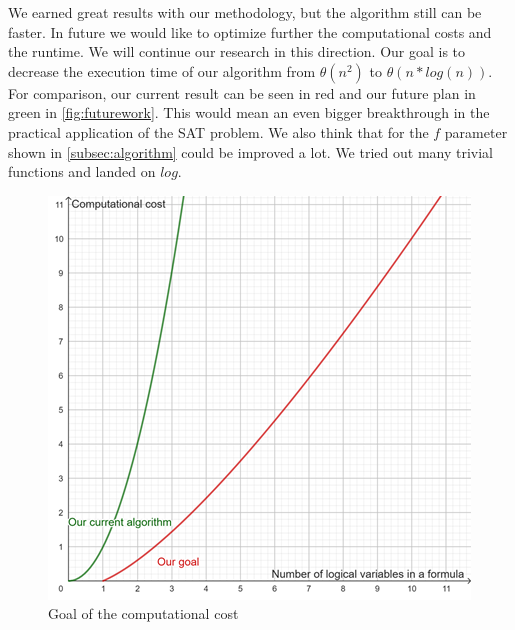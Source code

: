 \documentclass{article}
\begin{document}
We earned great results with our methodology, but the algorithm still can be faster.
In future we would like to optimize further the computational costs and the runtime.
We will continue our research in this direction. 
Our goal is to decrease the execution time of our algorithm from $\theta(n^2)$ to $\theta (n*log(n))$. For comparison, our current result can be seen in red and our future plan in green in \autoref{fig:futurework}. This would mean an even bigger breakthrough in the practical application of the SAT problem. We also think that for the $f$ parameter shown in \autoref{subsec:algorithm} could be improved a lot. We tried out many trivial functions and landed on $log$.
\begin{figure}[h]
    \centering
    \includegraphics[width=0.5\linewidth]{img/futurework.png}
    \caption{Goal of the computational cost}
	\label{fig:futurework}
\end{figure}


\end{document}
